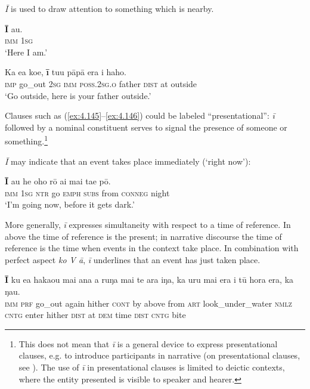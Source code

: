 \textit{{\ꞌ}Ī} is used to draw attention to something which is nearby. 

\ea\label{ex:4.145}
\gll \textbf{{\ꞌ}Ī} au. \\
\textsc{imm} \textsc{1sg} \\

\glt 
‘Here I am.’ \textstyleExampleref{[R363.078]} 
\z

\ea\label{ex:4.146}
\gll Ka e{\ꞌ}a koe, \textbf{{\ꞌ}ī} tu{\ꞌ}u pāpā era {\ꞌ}i haho. \\
\textsc{imp} go\_out \textsc{2sg} \textsc{imm} \textsc{poss.2sg.o} father \textsc{dist} at outside \\

\glt
‘Go outside, here is your father outside.’ \textstyleExampleref{[R210.094]} 
\z

Clauses such as (\ref{ex:4.145}–\ref{ex:4.146}) could be labeled “presentational”: \textit{{\ꞌ}ī} followed by a nominal constituent serves to signal the presence of someone or something.\footnote{\label{fn:201}This does not mean that \textit{{\ꞌ}ī} is a general device to express presentational clauses, e.g. to introduce participants in narrative (on presentational clauses, see \citealt[4]{Bailey2009}). The use of \textit{{\ꞌ}ī} in presentational clauses is limited to deictic contexts, where the entity presented is visible to speaker and hearer.} 

\textit{{\ꞌ}Ī} may indicate that an event takes place immediately (‘right now’): 

\ea\label{ex:4.147}
\gll \textbf{{\ꞌ}Ī} au he oho rō {\ꞌ}ai mai ta{\ꞌ}e pō. \\
\textsc{imm} \textsc{1sg} \textsc{ntr} go \textsc{emph} \textsc{subs} from \textsc{conneg} night \\

\glt
‘I’m going now, before it gets dark.’ \textstyleExampleref{[R153.042]} 
\z

More generally, \textit{{\ꞌ}ī} expresses simultaneity with respect to a time of reference. In  above the time of reference is the present; in narrative discourse the time of reference is the time when events in the context take place. In combination with perfect aspect \textit{ko V {\ꞌ}ā}, \textit{{\ꞌ}ī} underlines that an event has just taken place.

\ea\label{ex:4.148}
\gll \textbf{{\ꞌ}Ī} ku e{\ꞌ}a haka{\ꞌ}ou mai {\ꞌ}ana a ruŋa mai te {\ꞌ}ara iŋa,   ka uru mai era {\ꞌ}i tū hora era, ka ŋau.\\
\textsc{imm} \textsc{prf} go\_out again hither \textsc{cont} by above from \textsc{art} look\_under\_water \textsc{nmlz}   \textsc{cntg} enter hither \textsc{dist} at \textsc{dem} time \textsc{dist} \textsc{cntg} bite\\

